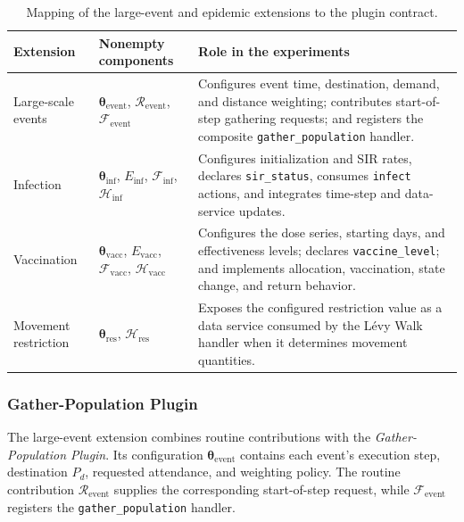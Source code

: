 \begin{table}[ht]
\centering
\footnotesize
\setlength{\tabcolsep}{4pt}
\caption{Mapping of the large-event and epidemic extensions to the plugin contract.}
\label{tbl:large_scale_epidemic_plugin_contract}
\begin{tabularx}{\linewidth}{@{}p{2.5cm}p{4.0cm}X@{}}
\toprule
\textbf{Extension} & \textbf{Nonempty components} & \textbf{Role in the experiments} \\
\midrule
Large-scale events
& $\bm{\theta}_{\mathrm{event}}$, $\mathcal{R}_{\mathrm{event}}$, $\mathcal{F}_{\mathrm{event}}$
& Configures event time, destination, demand, and distance weighting; contributes start-of-step gathering requests; and registers the composite \texttt{gather\_population} handler. \\
Infection
& $\bm{\theta}_{\mathrm{inf}}$, $E_{\mathrm{inf}}$, $\mathcal{F}_{\mathrm{inf}}$, $\mathcal{H}_{\mathrm{inf}}$
& Configures initialization and SIR rates, declares \texttt{sir\_status}, consumes \texttt{infect} actions, and integrates time-step and data-service updates. \\
Vaccination
& $\bm{\theta}_{\mathrm{vacc}}$, $E_{\mathrm{vacc}}$, $\mathcal{F}_{\mathrm{vacc}}$, $\mathcal{H}_{\mathrm{vacc}}$
& Configures the dose series, starting days, and effectiveness levels; declares \texttt{vaccine\_level}; and implements allocation, vaccination, state change, and return behavior. \\
Movement restriction
& $\bm{\theta}_{\mathrm{res}}$, $\mathcal{H}_{\mathrm{res}}$
& Exposes the configured restriction value as a data service consumed by the L\'evy Walk handler when it determines movement quantities. \\
\bottomrule
\end{tabularx}
\end{table}
\FloatBarrier


\subsubsection{Gather-Population Plugin}

The large-event extension combines routine contributions with the \textit{Gather-Population Plugin}. Its configuration $\bm{\theta}_{\mathrm{event}}$ contains each event's execution step, destination $P_d$, requested attendance, and weighting policy. The routine contribution $\mathcal{R}_{\mathrm{event}}$ supplies the corresponding start-of-step request, while $\mathcal{F}_{\mathrm{event}}$ registers the \texttt{gather\_population} handler.

